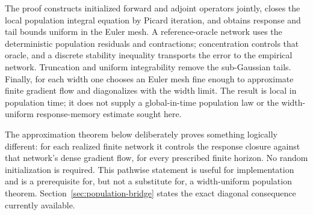 The proof constructs initialized forward and adjoint operators jointly,
closes the local population integral equation by Picard iteration, and obtains
response and tail bounds uniform in the Euler mesh.  A reference-oracle network
uses the deterministic population residuals and contractions; concentration
controls that oracle, and a discrete stability inequality transports the
error to the empirical network.  Truncation and uniform integrability remove
the sub-Gaussian tails.  Finally, for each width one chooses an Euler mesh fine
enough to approximate finite gradient flow and diagonalizes with the width
limit.  The result is local in population time; it does not supply a
global-in-time population law or the width-uniform response-memory estimate
sought here.

The approximation theorem below deliberately proves something logically
different: for each realized finite network it controls the response closure
against that network's dense gradient flow, for every prescribed finite
horizon.  No random initialization is required.  This pathwise statement is
useful for implementation and is a prerequisite for, but not a substitute
for, a width-uniform population theorem.  Section~\ref{sec:population-bridge}
states the exact diagonal consequence currently available.
